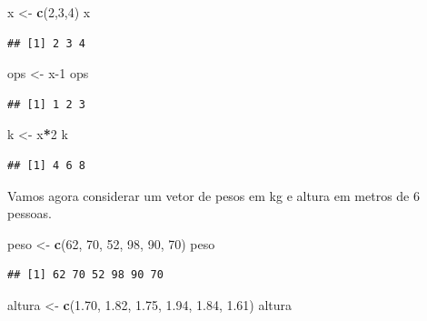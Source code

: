 \documentclass[
]{book}
\newenvironment{Shaded}{\begin{snugshade}}{\end{snugshade}}
\newcommand{\DecValTok}[1]{\textcolor[rgb]{0.00,0.00,0.81}{#1}}
\newcommand{\FloatTok}[1]{\textcolor[rgb]{0.00,0.00,0.81}{#1}}
\newcommand{\KeywordTok}[1]{\textcolor[rgb]{0.13,0.29,0.53}{\textbf{#1}}}
\newcommand{\NormalTok}[1]{#1}
\newcommand{\OperatorTok}[1]{\textcolor[rgb]{0.81,0.36,0.00}{\textbf{#1}}}
\newcommand{\StringTok}[1]{\textcolor[rgb]{0.31,0.60,0.02}{#1}}
\begin{document}
\begin{Shaded}
\begin{Highlighting}[]
\NormalTok{x <-}\StringTok{ }\KeywordTok{c}\NormalTok{(}\DecValTok{2}\NormalTok{,}\DecValTok{3}\NormalTok{,}\DecValTok{4}\NormalTok{)}
\NormalTok{x}
\end{Highlighting}
\end{Shaded}

\begin{verbatim}
## [1] 2 3 4
\end{verbatim}

\begin{Shaded}
\begin{Highlighting}[]
\NormalTok{ops <-}\StringTok{ }\NormalTok{x}\DecValTok{-1}
\NormalTok{ops}
\end{Highlighting}
\end{Shaded}

\begin{verbatim}
## [1] 1 2 3
\end{verbatim}

\begin{Shaded}
\begin{Highlighting}[]
\NormalTok{k <-}\StringTok{ }\NormalTok{x}\OperatorTok{*}\DecValTok{2}
\NormalTok{k}
\end{Highlighting}
\end{Shaded}

\begin{verbatim}
## [1] 4 6 8
\end{verbatim}

Vamos agora considerar um vetor de pesos em kg e altura em metros de 6 pessoas.

\begin{Shaded}
\begin{Highlighting}[]
\NormalTok{peso <-}\StringTok{ }\KeywordTok{c}\NormalTok{(}\DecValTok{62}\NormalTok{, }\DecValTok{70}\NormalTok{, }\DecValTok{52}\NormalTok{, }\DecValTok{98}\NormalTok{, }\DecValTok{90}\NormalTok{, }\DecValTok{70}\NormalTok{)}
\NormalTok{peso}
\end{Highlighting}
\end{Shaded}

\begin{verbatim}
## [1] 62 70 52 98 90 70
\end{verbatim}

\begin{Shaded}
\begin{Highlighting}[]
\NormalTok{altura <-}\StringTok{ }\KeywordTok{c}\NormalTok{(}\FloatTok{1.70}\NormalTok{, }\FloatTok{1.82}\NormalTok{, }\FloatTok{1.75}\NormalTok{, }\FloatTok{1.94}\NormalTok{, }\FloatTok{1.84}\NormalTok{, }\FloatTok{1.61}\NormalTok{)}
\NormalTok{altura}
\end{Highlighting}
\end{Shaded}
\end{document}
